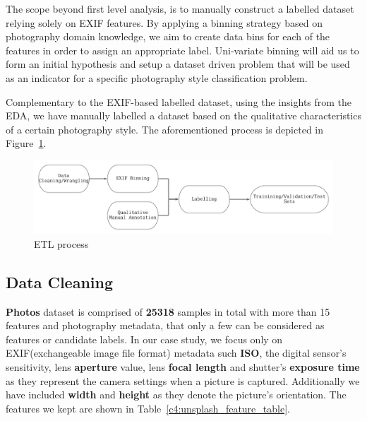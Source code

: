 The scope beyond first level analysis, is to manually construct a labelled dataset relying solely on EXIF features. By applying a binning strategy based on photography domain knowledge, we aim to create data bins for each of the features in order to assign an appropriate label.
Uni-variate binning will aid us to form an initial hypothesis and setup a dataset driven problem that will be used as an indicator for a specific photography style classification problem.

Complementary to the EXIF-based labelled dataset, using the insights from the EDA, we have manually labelled a dataset based on the qualitative characteristics of a certain photography style.
The aforementioned process is depicted in Figure~\ref{c4:etl}.

\begin{figure}[ht!]
    \centering  
    \includegraphics[width=.9\textwidth]{figures/chap4/etl}
    \caption{ETL process}
    \label{c4:etl}
\end{figure}

\subsection{Data Cleaning}
\label{c4:data_cleaning}

\textbf{Photos} dataset is comprised of \textbf{25318} samples in total with more than 15 features and photography metadata, that only a few can be considered as features or candidate labels.
In our case study, we focus only on EXIF(exchangeable image file format) metadata such \textbf{ISO}, the digital sensor's sensitivity, lens \textbf{aperture} value, lens \textbf{focal length} and shutter's \textbf{exposure time} as they represent the camera settings when a picture is captured. Additionally we have included \textbf{width} and \textbf{height} as they denote the picture's orientation.
The features we kept are shown in Table~\ref{c4:unsplash_feature_table}.


